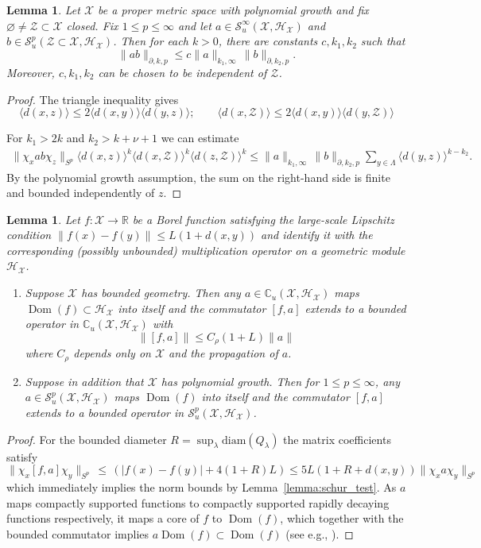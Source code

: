 \documentclass[12pt]{amsart}
\newtheorem{lemma}[theorem]{Lemma}
\newcommand{\CM}{{\mathbb C}}
\newcommand{\RM}{{\mathbb R}}
\newcommand{\Ss}{{\mathcal S}}
\newcommand{\Hh}{{\mathcal H}}
\newcommand{\Xx}{{\mathcal X}}
\newcommand{\Zz}{{\mathcal Z}}
\newcommand{\pdv}{\partial}
\DeclareMathOperator*{\Dom}{Dom}
\begin{document}
\begin{lemma}
\label{lemma:boundary_estimate}
Let $\Xx$ be a proper metric space with polynomial growth and fix $\varnothing \neq \Zz\subset \Xx$ closed.
Fix $1 \leq p \leq \infty$ and let $a\in \Ss_u^\infty(\Xx, \Hh_\Xx)$ and $b\in \Ss_u^p(\Zz\subset \Xx, \Hh_\Xx)$. 
Then for each $k>0$, there are constants $c, k_1,k_2$ such that
$$\|ab\|_{\pdv, k, p}\leq c\|a\|_{k_1, \infty}\, \|b\|_{\pdv,k_2, p}.$$
Moreover, $c,k_1,k_2$ can be chosen to be independent of $\Zz$.
\end{lemma}
\begin{proof}
The triangle inequality gives 
\[ \langle d(x,z)\rangle \leq 2\langle d(x,y)\rangle \langle d(y,z)\rangle; \qquad  \langle d(x,\Zz)\rangle \leq 2\langle d(x,y)\rangle \langle d(y,\Zz)\rangle\]

For $k_1>2k$ and $k_2>k+\nu +1$ we can estimate
\begin{align*}
\|\chi_{x} ab\chi_z\|_{S^p} \langle d(x,z)\rangle^k \langle d(x,\Zz)\rangle^k \langle d(z, \Zz)\rangle^k \leq   \|a\|_{k_1, \infty}\, \|b\|_{\pdv,k_2,p} \sum_{y\in \Lambda} \langle d(y,z)\rangle^{k-k_2}.
\end{align*} 
By the polynomial growth assumption, the sum on the right-hand side is finite and bounded independently of $z$.
\end{proof}

\begin{lemma}\label{lemma:lipschitz}
Let $f:\Xx\to\RM$ be a Borel function satisfying the large-scale Lipschitz condition $\|f(x)-f(y)\|\leq L (1+d(x,y))$ and identify it with the corresponding (possibly unbounded) multiplication operator on a geometric module $\Hh_\Xx$.

\begin{enumerate}
    \item[(i)] Suppose $\Xx$ has bounded geometry. Then any $a\in \CM_u(\Xx, \Hh_\Xx)$ maps $\Dom(f)\subset \Hh_\Xx$ into itself and the commutator $[f, a]$ extends to a bounded operator in $\CM_u(\Xx, \Hh_\Xx)$ with
\[\|[f,a]\|\leq C_\rho (1+L)\|a\|\]
where $C_\rho$ depends only on $\Xx$ and the propagation of $a$.
\item[(ii)] Suppose in addition that $\Xx$ has polynomial growth. Then for $1 \leq p \leq \infty$, any $a\in \Ss_u^p(\Xx, \Hh_\Xx)$ maps $\Dom(f)$ into itself and the commutator $[f, a]$ extends to a bounded operator in $\Ss^p_u(\Xx, \Hh_\Xx)$.
\end{enumerate}
\end{lemma}
\begin{proof}
For the bounded diameter $R=\sup_\lambda \mathrm{diam}(Q_\lambda)$ the matrix coefficients satisfy
$$\|\chi_x [f,a]\chi_y\|_{S^p}\, \leq\, (|f(x)-f(y)|+ 4(1+R)L)\leq 5L(1+R+d(x,y)) \| \chi_x  a \chi_y\|_{S^p}$$
which immediately implies the norm bounds by Lemma~\ref{lemma:schur_test}. 
As $a$ maps compactly supported functions to compactly supported rapidly decaying functions respectively, it maps a core of $f$ to $\Dom(f)$, which together with the bounded commutator implies $a \Dom(f)\subset \Dom(f)$ (see e.g., \cite[Proposition~2.1]{ForsythMeslandRennie2014}).
\end{proof}
\end{document}
